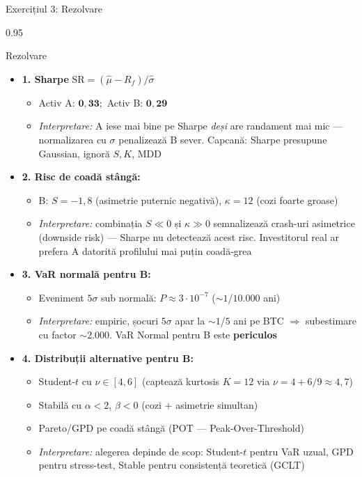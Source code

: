 \documentclass[9pt, aspectratio=169, t]{beamer}
\begin{document}
\begin{frame}[shrink=25]{Exercițiul 3: Rezolvare}
\begin{cminipage}{0.95\textwidth}
\begin{exampleblock}{Rezolvare}
\begin{itemize}\setlength{\itemsep}{0pt}
    \item \textbf{1. Sharpe} \quad $\text{SR} = (\hat\mu - R_f)/\hat\sigma$
    \begin{itemize}\setlength{\itemsep}{0pt}
        \item Activ A: $\mathbf{0{,}33}$;\ Activ B: $\mathbf{0{,}29}$
        \item \textit{Interpretare:} A iese mai bine pe Sharpe \emph{deși} are randament mai mic --- normalizarea cu $\sigma$ penalizează B sever. Capcană: Sharpe presupune Gaussian, ignoră $S, K$, MDD
    \end{itemize}
    \item \textbf{2. Risc de coadă stângă:}
    \begin{itemize}\setlength{\itemsep}{0pt}
        \item B: $S = -1{,}8$ (asimetrie puternic negativă), $\kappa = 12$ (cozi foarte groase)
        \item \textit{Interpretare:} combinația $S \ll 0$ și $\kappa \gg 0$ semnalizează crash-uri asimetrice (downside risk) --- Sharpe nu detectează acest risc. Investitorul real ar prefera A datorită profilului mai puțin coadă-grea
    \end{itemize}
    \item \textbf{3. VaR normală pentru B:}
    \begin{itemize}\setlength{\itemsep}{0pt}
        \item Eveniment $5\sigma$ sub normală: $P \approx 3 \cdot 10^{-7}$ ($\sim 1$/$10.000$ ani)
        \item \textit{Interpretare:} empiric, șocuri $5\sigma$ apar la $\sim 1$/$5$ ani pe BTC $\Rightarrow$ subestimare cu factor $\sim 2.000$. VaR Normal pentru B este \textbf{periculos}
    \end{itemize}
    \item \textbf{4. Distribuții alternative pentru B:}
    \begin{itemize}\setlength{\itemsep}{0pt}
        \item Student-$t$ cu $\nu \in [4, 6]$ (captează kurtosis $K = 12$ via $\nu = 4 + 6/9 \approx 4{,}7$)
        \item Stabilă cu $\alpha < 2$, $\beta < 0$ (cozi $+$ asimetrie simultan)
        \item Pareto/GPD pe coadă stângă (POT --- Peak-Over-Threshold)
        \item \textit{Interpretare:} alegerea depinde de scop: Student-$t$ pentru VaR uzual, GPD pentru stress-test, Stable pentru consistență teoretică (GCLT)
    \end{itemize}
\end{itemize}
\end{exampleblock}
\end{cminipage}
\end{frame}
\end{document}
